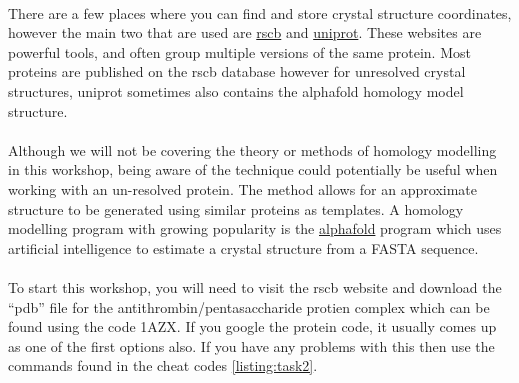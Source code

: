   \paragraph{}
  There are a few places where you can find and store crystal structure coordinates, however the main two that are used are \href{https://www.rcsb.org/}{rscb} and \href{https://www.uniprot.org/}{uniprot}. These websites are powerful tools, and often group multiple versions of the same protein. Most proteins are published on the rscb database however for unresolved crystal structures, uniprot sometimes also contains the alphafold\cite{} homology model structure. 

  \paragraph{}
  Although we will not be covering the theory or methods of homology modelling in this workshop, being aware of the technique could potentially be useful when working with an un-resolved protein. The method allows for an approximate structure to be generated using similar proteins as templates. A homology modelling program with growing popularity is the \href{https://www.deepmind.com/research/highlighted-research/alphafold}{alphafold}\cite{} program which uses artificial intelligence to estimate a crystal structure from a FASTA sequence.

  \paragraph{}
  To start this workshop, you will need to visit the rscb website and download the \enquote{pdb} file for the antithrombin/pentasaccharide protien complex which can be found using the code 1AZX.  If you google the protein code, it usually comes up as one of the first options also. If you have any problems with this then use the commands found in the cheat codes \cref{listing:task2}.